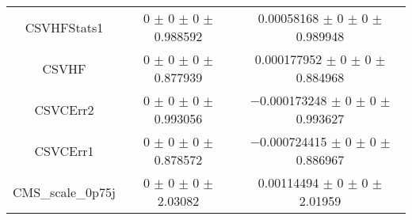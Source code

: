 \begin{table}
\begin{tabular}{ccc}
CSVHFStats1 & \num{0} $\pm$ \num{0} $\pm$ \num{0} $\pm$ \num{0.988592} & \num{0.00058168} $\pm$ \num{0} $\pm$ \num{0} $\pm$ \num{0.989948}\\
CSVHF & \num{0} $\pm$ \num{0} $\pm$ \num{0} $\pm$ \num{0.877939} & \num{0.000177952} $\pm$ \num{0} $\pm$ \num{0} $\pm$ \num{0.884968}\\
CSVCErr2 & \num{0} $\pm$ \num{0} $\pm$ \num{0} $\pm$ \num{0.993056} & \num{-0.000173248} $\pm$ \num{0} $\pm$ \num{0} $\pm$ \num{0.993627}\\
CSVCErr1 & \num{0} $\pm$ \num{0} $\pm$ \num{0} $\pm$ \num{0.878572} & \num{-0.000724415} $\pm$ \num{0} $\pm$ \num{0} $\pm$ \num{0.886967}\\
CMS\_scale\_0p75j & \num{0} $\pm$ \num{0} $\pm$ \num{0} $\pm$ \num{2.03082} & \num{0.00114494} $\pm$ \num{0} $\pm$ \num{0} $\pm$ \num{2.01959}\\
\bottomrule
\end{tabular}
\end{table}